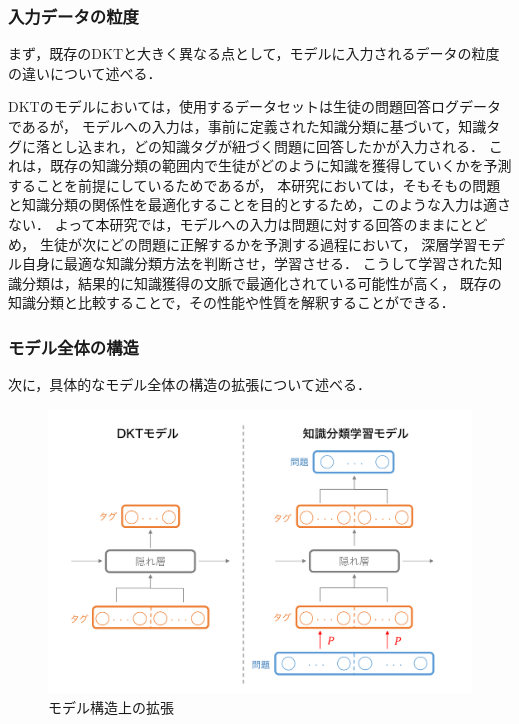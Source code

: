 \subsubsection{入力データの粒度}
まず，既存のDKTと大きく異なる点として，モデルに入力されるデータの粒度の違いについて述べる．

DKTのモデルにおいては，使用するデータセットは生徒の問題回答ログデータであるが，
モデルへの入力は，事前に定義された知識分類に基づいて，知識タグに落とし込まれ，どの知識タグが紐づく問題に回答したかが入力される．
これは，既存の知識分類の範囲内で生徒がどのように知識を獲得していくかを予測することを前提にしているためであるが，
本研究においては，そもそもの問題と知識分類の関係性を最適化することを目的とするため，このような入力は適さない．
よって本研究では，モデルへの入力は問題に対する回答のままにとどめ，
生徒が次にどの問題に正解するかを予測する過程において，
深層学習モデル自身に最適な知識分類方法を判断させ，学習させる．
こうして学習された知識分類は，結果的に知識獲得の文脈で最適化されている可能性が高く，
既存の知識分類と比較することで，その性能や性質を解釈することができる．


\subsubsection{モデル全体の構造}
次に，具体的なモデル全体の構造の拡張について述べる．

\begin{figure}[htb]
\begin{center}
	\includegraphics[width=360pt]{./img/model.png}
	\caption{モデル構造上の拡張}
	\label{fig:model}
\end{center}
\end{figure}

